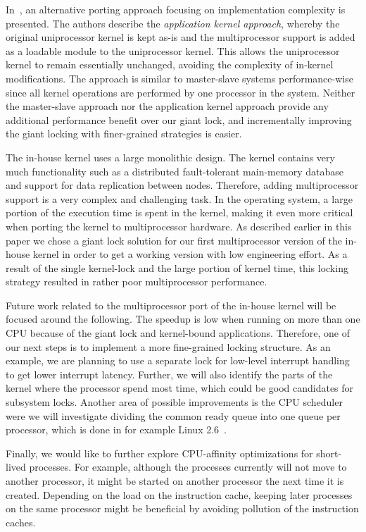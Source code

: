 In~\cite{kagstrom05appkern}, an alternative porting approach focusing on implementation
complexity is presented. The authors describe the \emph{application kernel
  approach}, whereby the original uniprocessor kernel is kept as-is and the
multiprocessor support is added as a loadable module to the uniprocessor
kernel. This allows the uniprocessor kernel to remain essentially unchanged,
avoiding the complexity of in-kernel modifications. The approach is similar to
master-slave systems performance-wise since all kernel operations are
performed by one processor in the system. Neither the master-slave approach
nor the application kernel approach provide any additional performance benefit
over our giant lock, and incrementally improving the giant locking with
finer-grained strategies is easier.

The in-house kernel uses a large monolithic design. The kernel contains very
much functionality such as a distributed fault-tolerant main-memory database
and support for data replication between nodes.  Therefore, adding
multiprocessor support is a very complex and challenging task.  In the
operating system, a large portion of the execution time is spent in the
kernel, making it even more critical when porting the kernel to multiprocessor
hardware.  As described earlier in this paper we chose a giant lock solution
for our first multiprocessor version of the in-house kernel in order to get a
working version with low engineering effort. As a result of the single
kernel-lock and the large portion of kernel time, this locking strategy
resulted in rather poor multiprocessor performance.

Future work related to the multiprocessor port of the in-house kernel will be
focused around the following. The speedup is low when running on more than one
CPU because of the giant lock and kernel-bound applications. Therefore, one of
our next steps is to implement a more fine-grained locking structure. As an
example, we are planning to use a separate lock for low-level interrupt
handling to get lower interrupt latency. Further, we will also identify the
parts of the kernel where the processor spend most time, which could be good
candidates for subsystem locks.  Another area of possible improvements is the
CPU scheduler were we will investigate dividing the common ready queue into
one queue per processor, which is done in for example Linux
2.6~\cite{love2003linux}.

Finally, we would like to further explore CPU-affinity optimizations for
short-lived processes. For example, although the processes currently will not
move to another processor, it might be started on another processor the next
time it is created. Depending on the load on the instruction cache, keeping
later processes on the same processor might be beneficial by avoiding
pollution of the instruction caches.

